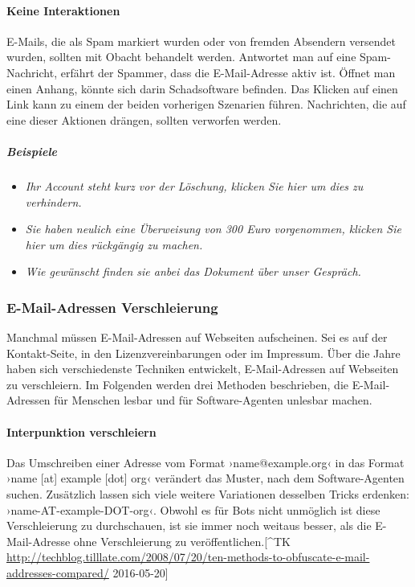 \paragraph{Keine Interaktionen}
\label{par:keine-interaktionen}

E-Mails, die als Spam markiert wurden oder von fremden Absendern
versendet wurden, sollten mit Obacht behandelt werden. Antwortet man auf
eine Spam-Nachricht, erfährt der Spammer, dass die E-Mail-Adresse aktiv
ist. Öffnet man einen Anhang, könnte sich darin Schadsoftware befinden.
Das Klicken auf einen Link kann zu einem der beiden vorherigen Szenarien
führen. Nachrichten, die auf eine dieser Aktionen drängen, sollten
verworfen werden.

\subparagraph{Beispiele}
\label{spar:beispiele}

\begin{itemize}
\tightlist
\item
  \emph{Ihr Account steht kurz vor der Löschung, klicken Sie hier um
  dies zu verhindern.}
\item
  \emph{Sie haben neulich eine Überweisung von 300 Euro vorgenommen,
  klicken Sie hier um dies rückgängig zu machen.}
\item
  \emph{Wie gewünscht finden sie anbei das Dokument über unser
  Gespräch.}
\end{itemize}

\subsubsection{E-Mail-Adressen Verschleierung}
\label{ssub:e-mail-adressen-verschleierung}

Manchmal müssen E-Mail-Adressen auf Webseiten aufscheinen. Sei es auf
der Kontakt-Seite, in den Lizenzvereinbarungen oder im Impressum. Über
die Jahre haben sich verschiedenste Techniken entwickelt,
E-Mail-Adressen auf Webseiten zu verschleiern. Im Folgenden werden drei
Methoden beschrieben, die E-Mail-Adressen für Menschen lesbar und für
Software-Agenten unlesbar machen.

\paragraph{Interpunktion verschleiern}
\label{par:interpunktion-verschleiern}

Das Umschreiben einer Adresse vom Format ›name@example.org‹ in das
Format ›name {[}at{]} example {[}dot{]} org‹ verändert das Muster, nach
dem Software-Agenten suchen. Zusätzlich lassen sich viele weitere
Variationen desselben Tricks erdenken: ›name-AT-example-DOT-org‹. Obwohl
es für Bots nicht unmöglich ist diese Verschleierung zu durchschauen,
ist sie immer noch weitaus besser, als die E-Mail-Adresse ohne
Verschleierung zu veröffentlichen.{[}\^{}TK
\url{http://techblog.tilllate.com/2008/07/20/ten-methods-to-obfuscate-e-mail-addresses-compared/}
2016-05-20{]}

